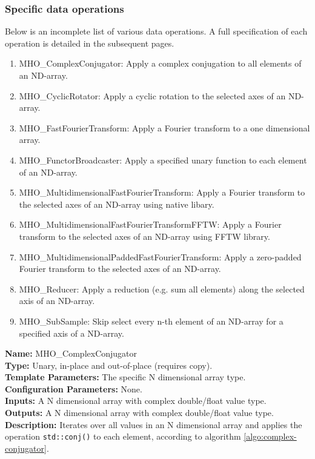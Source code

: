 

\subsubsection{Specific data operations}

Below is an incomplete list of various data operations. A full specification of each operation is detailed in the subsequent pages.
\begin{enumerate}
 \item MHO\_ComplexConjugator: Apply a complex conjugation to all elements of an ND-array.
 \item MHO\_CyclicRotator: Apply a cyclic rotation to the selected axes of an ND-array.
 \item MHO\_FastFourierTransform: Apply a Fourier transform to a one dimensional array.
 \item MHO\_FunctorBroadcaster: Apply a specified unary function to each element of an ND-array.
 \item MHO\_MultidimensionalFastFourierTransform: Apply a Fourier transform to the selected axes of an ND-array using native libary.
 \item MHO\_MultidimensionalFastFourierTransformFFTW: Apply a Fourier transform to the selected axes of an ND-array using FFTW library.
 \item MHO\_MultidimensionalPaddedFastFourierTransform: Apply a zero-padded Fourier transform to the selected axes of an ND-array.
 \item MHO\_Reducer: Apply a reduction (e.g. sum all elements) along the selected axis of an ND-array.
 \item MHO\_SubSample: Skip select every n-th element of an ND-array for a specified axis of a ND-array.
\end{enumerate}

\newpage

\noindent \textbf{Name:} MHO\_ComplexConjugator \\
\textbf{Type:} Unary, in-place and out-of-place (requires copy). \\
\textbf{Template Parameters:} The specific N dimensional array type.\\
\textbf{Configuration Parameters:} None.\\
\textbf{Inputs:} A N dimensional array with complex double/float value type. \\
\textbf{Outputs:} A N dimensional array with complex double/float value type. \\
\textbf{Description:} Iterates over all values in an N dimensional array and applies the operation \texttt{std::conj()} to each element, according to algorithm \ref{algo:complex-conjugator}. \\


